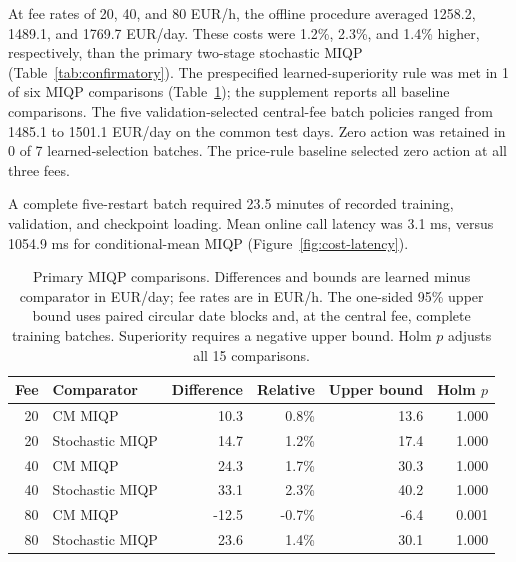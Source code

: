 At fee rates of 20, 40, and 80 EUR/h, the offline procedure averaged 1258.2, 1489.1, and 1769.7 EUR/day. These costs were 1.2\%, 2.3\%, and 1.4\% higher, respectively, than the primary two-stage stochastic MIQP (Table~\ref{tab:confirmatory}). The prespecified learned-superiority rule was met in 1 of six MIQP comparisons (Table~\ref{tab:paired}); the supplement reports all baseline comparisons.
The five validation-selected central-fee batch policies ranged from 1485.1 to 1501.1 EUR/day on the common test days.
Zero action was retained in 0 of 7 learned-selection batches. The price-rule baseline selected zero action at all three fees.

A complete five-restart batch required 23.5 minutes of recorded training, validation, and checkpoint loading. Mean online call latency was 3.1 ms, versus 1054.9 ms for conditional-mean MIQP (Figure~\ref{fig:cost-latency}).

\begin{table}[tbp]
\centering
\caption{Primary MIQP comparisons. Differences and bounds are learned minus comparator in EUR/day; fee rates are in EUR/h. The one-sided 95\% upper bound uses paired circular date blocks and, at the central fee, complete training batches. Superiority requires a negative upper bound. Holm $p$ adjusts all 15 comparisons.}
\label{tab:paired}
\small
\begin{tabularx}{\linewidth}{r>{\raggedright\arraybackslash}Xrrrr}
\toprule
Fee & Comparator & Difference & Relative & Upper bound & Holm $p$ \\
\midrule
20 & CM MIQP & 10.3 & 0.8\% & 13.6 & 1.000 \\
20 & Stochastic MIQP & 14.7 & 1.2\% & 17.4 & 1.000 \\
40 & CM MIQP & 24.3 & 1.7\% & 30.3 & 1.000 \\
40 & Stochastic MIQP & 33.1 & 2.3\% & 40.2 & 1.000 \\
80 & CM MIQP & -12.5 & -0.7\% & -6.4 & 0.001 \\
80 & Stochastic MIQP & 23.6 & 1.4\% & 30.1 & 1.000 \\
\bottomrule
\end{tabularx}
\end{table}